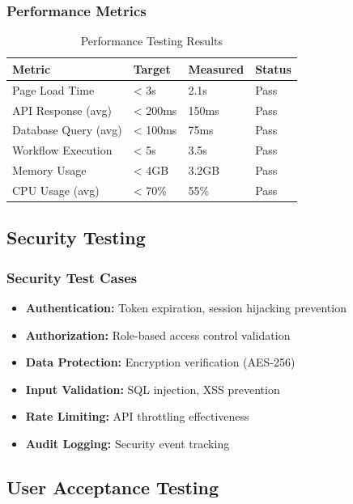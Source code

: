 \documentclass[12pt,a4paper]{article}
\begin{document}
\subsubsection{Performance Metrics}
\begin{table}[h]
\centering
\begin{tabularx}{\textwidth}{|l|l|l|l|}
\hline
\textbf{Metric} & \textbf{Target} & \textbf{Measured} & \textbf{Status}\\
\hline
Page Load Time & < 3s & 2.1s & Pass\\
\hline
API Response (avg) & < 200ms & 150ms & Pass\\
\hline
Database Query (avg) & < 100ms & 75ms & Pass\\
\hline
Workflow Execution & < 5s & 3.5s & Pass\\
\hline
Memory Usage & < 4GB & 3.2GB & Pass\\
\hline
CPU Usage (avg) & < 70\% & 55\% & Pass\\
\hline
\end{tabularx}
\caption{Performance Testing Results}
\end{table}

\subsection{Security Testing}

\subsubsection{Security Test Cases}
\begin{itemize}
    \item \textbf{Authentication:} Token expiration, session hijacking prevention
    \item \textbf{Authorization:} Role-based access control validation
    \item \textbf{Data Protection:} Encryption verification (AES-256)
    \item \textbf{Input Validation:} SQL injection, XSS prevention
    \item \textbf{Rate Limiting:} API throttling effectiveness
    \item \textbf{Audit Logging:} Security event tracking
\end{itemize}

\subsection{User Acceptance Testing}
\end{document}
